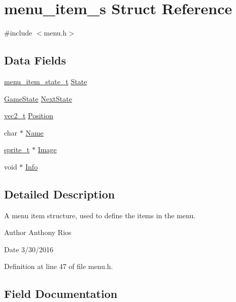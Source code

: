 \hypertarget{structmenu__item__s}{}\section{menu\+\_\+item\+\_\+s Struct Reference}
\label{structmenu__item__s}


{\ttfamily \#include $<$menu.\+h$>$}

\subsection*{Data Fields}
\begin{DoxyCompactItemize}
\item 
\hyperlink{globals_8h_a82d3a17b01eab2136e9f3ee50640b89f}{menu\+\_\+item\+\_\+state\+\_\+t} \hyperlink{structmenu__item__s_a549a5400c9f9b61bb66d0239bd21fe53}{State}
\item 
\hyperlink{globals_8h_a7899b65f1ea0f655e4bbf8d2a5714285}{Game\+State} \hyperlink{structmenu__item__s_ab0377c6660ff457af3498a0e121e42f0}{Next\+State}
\item 
\hyperlink{globals_8h_a773f2054819bb6014f1e50baa39cb5e3}{vec2\+\_\+t} \hyperlink{structmenu__item__s_ae69b5c22d5cd3911965dc992d40ba4fc}{Position}
\item 
char $\ast$ \hyperlink{structmenu__item__s_a5e6182c030324511dd82e9fa1a0ab071}{Name}
\item 
\hyperlink{graphics_8h_a5371414b10358aeda7c6bcec8196342f}{sprite\+\_\+t} $\ast$ \hyperlink{structmenu__item__s_a25fe573e4bbeefb06bccb0c0c9acf35f}{Image}
\item 
void $\ast$ \hyperlink{structmenu__item__s_a2459e5f05ca13ac8dff1f7b9abda4534}{Info}
\end{DoxyCompactItemize}


\subsection{Detailed Description}
A menu item structure, used to define the items in the menu.

\begin{DoxyAuthor}{Author}
Anthony Rios 
\end{DoxyAuthor}
\begin{DoxyDate}{Date}
3/30/2016 
\end{DoxyDate}


Definition at line 47 of file menu.\+h.



\subsection{Field Documentation}
